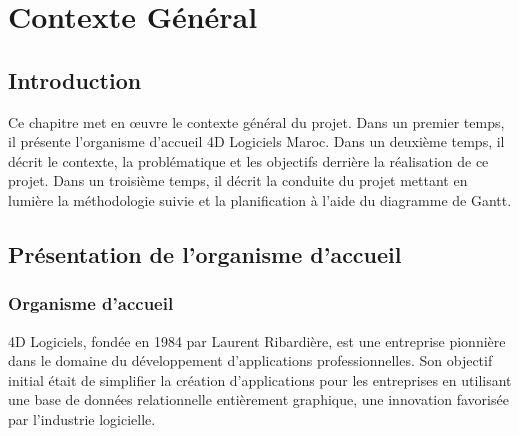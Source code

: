     \chapter{Contexte Général}
    \pagestyle{chapterstyle}    





\newpage
\vspace{1cm}



\section{Introduction}
Ce chapitre met en œuvre le contexte général du projet. Dans un premier temps, il
présente l’organisme d’accueil 4D Logiciels Maroc. Dans un deuxième temps, il décrit le contexte,
la problématique et les objectifs derrière la réalisation de ce projet. Dans
un troisième temps, il décrit la conduite du projet mettant en lumière la méthodologie
suivie et la planification à l’aide du diagramme de Gantt.
\section{Présentation de l’organisme d’accueil}
\subsection{Organisme d'accueil}

4D Logiciels, fondée en 1984 par Laurent Ribardière, est une entreprise pionnière dans
le domaine du développement d’applications professionnelles. Son objectif initial était de
simplifier la création d’applications pour les entreprises en utilisant une base de données
relationnelle entièrement graphique, une innovation favorisée par l’industrie logicielle.
\newline

